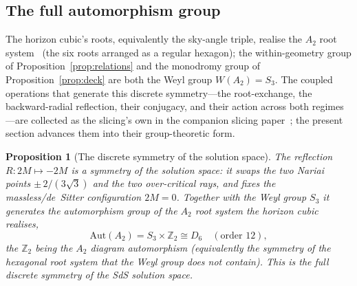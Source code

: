 \documentclass[11pt,a4paper]{article}
\newtheorem{proposition}[theorem]{Proposition}
\theoremstyle{definition}
\begin{document}
\subsection{The full automorphism group}\label{sec:autA2}

The horizon cubic's roots, equivalently the sky-angle triple, realise the $A_{2}$ root system~\cite{Humphreys1972} (the six roots arranged as a regular hexagon); the within-geometry group of Proposition~\ref{prop:relations} and the monodromy group of Proposition~\ref{prop:deck} are both the Weyl group $W(A_{2})=S_{3}$. The coupled operations that generate this discrete symmetry---the root-exchange, the backward-radial reflection, their conjugacy, and their action across both regimes---are collected as the slicing's own in the companion slicing paper~\cite{JanzenSlicing}; the present section advances them into their group-theoretic form.

\begin{proposition}[The discrete symmetry of the solution space]\label{prop:autA2}
The reflection $R:2M\mapsto-2M$ is a symmetry of the solution space: it swaps the two Nariai points $\pm\,2/(3\sqrt{3})$ and the two over-critical rays, and fixes the massless/de~Sitter configuration $2M=0$. Together with the Weyl group $S_{3}$ it generates the automorphism group of the $A_{2}$ root system the horizon cubic realises,
\[
\mathrm{Aut}(A_{2})=S_{3}\times\mathbb{Z}_{2}\cong D_{6}\quad(\text{order }12),
\]
the $\mathbb{Z}_{2}$ being the $A_{2}$ diagram automorphism (equivalently the symmetry of the hexagonal root system that the Weyl group does not contain). This is the full discrete symmetry of the SdS solution space.
\end{proposition}
\end{document}
